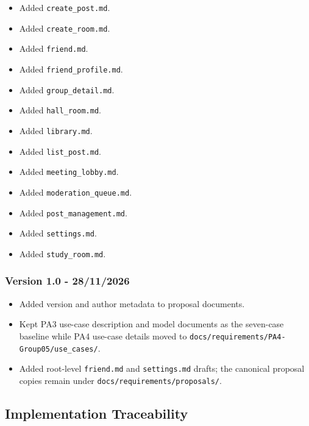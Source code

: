 \documentclass[12pt]{article}
\begin{document}
\begin{itemize}
\item Added \texttt{create\_post.md}.
\item Added \texttt{create\_room.md}.
\item Added \texttt{friend.md}.
\item Added \texttt{friend\_profile.md}.
\item Added \texttt{group\_detail.md}.
\item Added \texttt{hall\_room.md}.
\item Added \texttt{library.md}.
\item Added \texttt{list\_post.md}.
\item Added \texttt{meeting\_lobby.md}.
\item Added \texttt{moderation\_queue.md}.
\item Added \texttt{post\_management.md}.
\item Added \texttt{settings.md}.
\item Added \texttt{study\_room.md}.
\end{itemize}
\par\medskip

\hypertarget{sec:version-1-0-28-11-2026}{}
\subsubsection*{Version 1.0 - 28/11/2026}
\par\medskip

\begin{itemize}
\item Added version and author metadata to proposal documents.
\item Kept PA3 use-case description and model documents as the seven-case baseline while PA4 use-case details moved to \texttt{docs/requirements/PA4-Group05/use\_cases/}.
\item Added root-level \texttt{friend.md} and \texttt{settings.md} drafts; the canonical proposal copies remain under \texttt{docs/requirements/proposals/}.
\end{itemize}
\par\medskip

\hypertarget{sec:implementation-traceability}{}
\subsection*{Implementation Traceability}
\par\medskip
\end{document}
